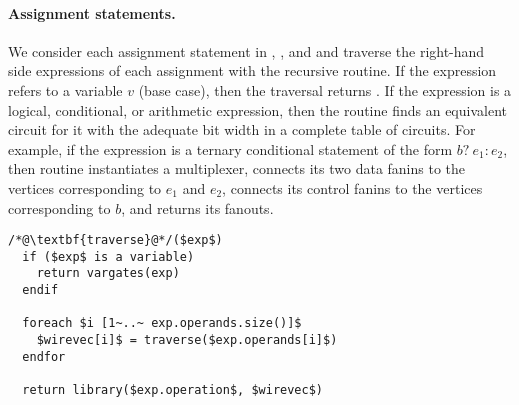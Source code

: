 \paragraph{Assignment statements.}
We consider each assignment statement in , ,
and  and traverse the right-hand side expressions of
each assignment with the recursive  routine. 
%
If the expression refers to a variable $v$ (base case), 
then the traversal returns . 
%
If the expression is a logical, conditional, or arithmetic expression, then
the  routine finds an equivalent circuit for it with the adequate bit
width in a complete table of circuits.
For example, if the expression is a ternary conditional statement of the
form $b?~e_1:e_2$, then routine  instantiates a multiplexer, 
connects its two data fanins to the vertices corresponding to $e_1$ and $e_2$, connects its control fanins to the vertices corresponding to $b$,
and returns its fanouts. 
%
\begin{lstlisting}
/*@\textbf{traverse}@*/($exp$)
  if ($exp$ is a variable) 
    return vargates(exp)
  endif

  foreach $i [1~..~ exp.operands.size()]$ 
    $wirevec[i]$ = traverse($exp.operands[i]$) 
  endfor

  return library($exp.operation$, $wirevec$)
\end{lstlisting}
%
%
%

